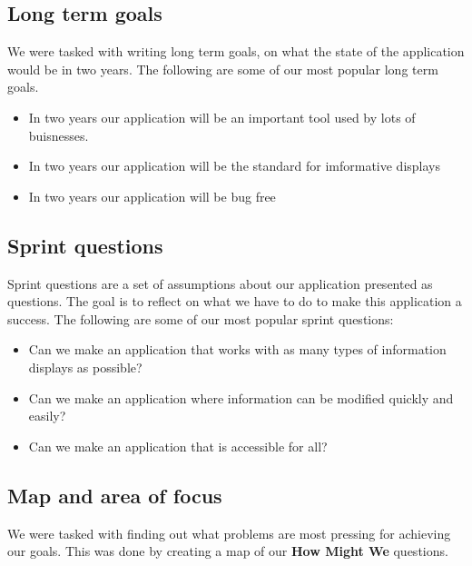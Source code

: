 \documentclass[12pt]{article}
\begin{document}
\subsection{Long term goals}
We were tasked with writing long term goals, on what the state of the application would be in two years.
The following are some of our most popular long term goals. 
\begin{itemize}
    \item In two years our application will be an important tool used by lots of buisnesses.
    \item In two years our application will be the standard for imformative displays
    \item In two years our application will be bug free
\end{itemize}
\subsection{Sprint questions}
Sprint questions are a set of assumptions about our application presented as questions.
The goal is to reflect on what we have to do to make this application a success.
The following are some of our most popular sprint questions:
\begin{itemize}
    \item Can we make an application that works with as many types of information displays as possible?
    \item Can we make an application where information can be modified quickly and easily?
    \item Can we make an application that is accessible for all?
\end{itemize}
\subsection{Map and area of focus}
We were tasked with finding out what problems are most pressing for achieving our goals.
This was done by creating a map of our \textbf{How Might We}\cite{WhatHowMight} questions.
\end{document}
